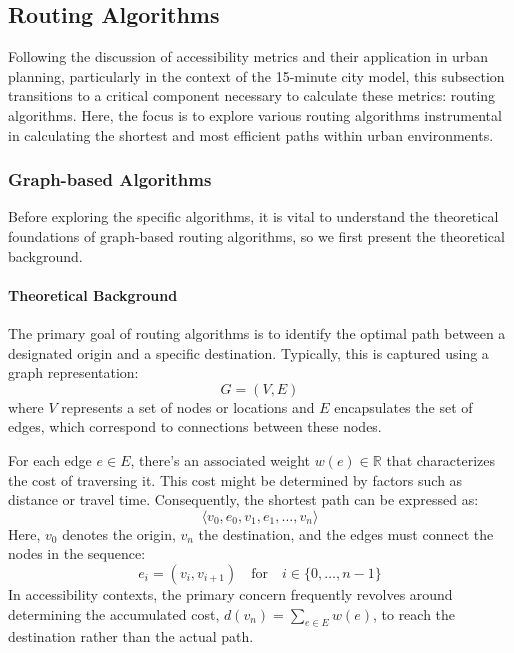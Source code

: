 \subsection{Routing Algorithms}
\label{subsec:routing_algorithms}

Following the discussion of accessibility metrics and their application in urban planning, particularly in the context of the 15-minute city model, this subsection transitions to a critical component necessary to calculate these metrics: routing algorithms.
Here, the focus is to explore various routing algorithms instrumental in calculating the shortest and most efficient paths within urban environments. 

\subsubsection{Graph-based Algorithms}

Before exploring the specific algorithms, it is vital to understand the theoretical foundations of graph-based routing algorithms, so we first present the theoretical background.

\paragraph{Theoretical Background}

The primary goal of routing algorithms is to identify the optimal path between a designated origin and a specific destination.
Typically, this is captured using a graph representation:
\[ G = (V, E) \]
where $V$ represents a set of nodes or locations and $E$ encapsulates the set of edges, which correspond to connections between these nodes.

For each edge \( e \in E \), there's an associated weight \( w(e) \in \mathbb{R} \) that characterizes the cost of traversing it.
This cost might be determined by factors such as distance or travel time.
Consequently, the shortest path can be expressed as:
\[ \langle v_0, e_0, v_1, e_1, \dots, v_n \rangle \]
Here, \( v_0 \) denotes the origin, \( v_n \) the destination, and the edges must connect the nodes in the sequence:
\[ e_i = (v_i, v_{i+1}) \quad \text{for} \quad i \in \{0, \dots, n-1\} \]
In accessibility contexts, the primary concern frequently revolves around determining the accumulated cost, \( d(v_n) = \sum_{e \in E} w(e) \), to reach the destination rather than the actual path.

